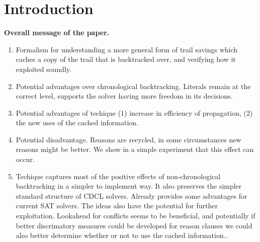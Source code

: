 \documentclass[runningheads]{llncs}
\renewcommand{\note}[1]{{\color{red}{#1}}}
\begin{document}
\section{Introduction}
\textbf{Overall message of the paper.}
\begin{enumerate}
\item Formalism for understanding a more general form of trail savings
    which caches a copy of the trail that is backtracked over, and
    verifying how it exploited soundly.

\item Potential advantages over chronological backtracking.  Literals
    remain at the correct level, supports the solver having more
    freedom in its decisions.

\item Potential advantages of techique (1) increase in efficiency of
    propagation, (2) the new uses of the cached information. 

\item Potential disadvantage. Reasons are recycled, in some circumstances
    new reasons might be better. We show in a simple experiment that
    this effect can occur.

\item Techique captures most of the positive effects of
    non-chronological backtracking in a simpler to implement way. It
    also preserves the simpler standard structure of CDCL
    solvers. Already provides some advantages for current SAT
    solvers. The ideas also have the potential for further
    exploitation. Lookahead for conflicts seems to be beneficial, and
    potentially if better discrimatory measures could be developed for
    reason clauses we could also better determine whether or not to
    use the cached information.. 
\end{enumerate}

\note{Reusing the Assignment Trail in CDCL Solvers: restart to level
  $i$ where the next decision has a higher score than the decision at
  level $i$ and a lower score than all decisions at level $j$ for
  $j< i$.

  They argum changes to reason clauses don't make much difference, but
  that was with minisat, before metrics for clause quality were in place in sat solvers.

  The savings for Luby-100 (used in minisat) were about 1\%}
\end{document}

